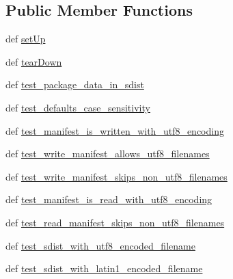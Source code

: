 \subsection*{Public Member Functions}
\begin{DoxyCompactItemize}
\item 
def \hyperlink{classsetuptools_1_1tests_1_1test__sdist_1_1TestSdistTest_ae2dbc5ce220773251c19c31be48920e6}{set\+Up}
\item 
def \hyperlink{classsetuptools_1_1tests_1_1test__sdist_1_1TestSdistTest_a79f76e00cf56e1de877a72e846bf489c}{tear\+Down}
\item 
def \hyperlink{classsetuptools_1_1tests_1_1test__sdist_1_1TestSdistTest_a3cf5c6aec4ee7a285187dd08b4dfbe5e}{test\+\_\+package\+\_\+data\+\_\+in\+\_\+sdist}
\item 
def \hyperlink{classsetuptools_1_1tests_1_1test__sdist_1_1TestSdistTest_a94e146b69c6dbac1b4d346b238a5f6f3}{test\+\_\+defaults\+\_\+case\+\_\+sensitivity}
\item 
def \hyperlink{classsetuptools_1_1tests_1_1test__sdist_1_1TestSdistTest_a2a6d02ca95bdf2d48029dbee362dc691}{test\+\_\+manifest\+\_\+is\+\_\+written\+\_\+with\+\_\+utf8\+\_\+encoding}
\item 
def \hyperlink{classsetuptools_1_1tests_1_1test__sdist_1_1TestSdistTest_a4fb3e5fbfe2f50c4477f91db4aad602b}{test\+\_\+write\+\_\+manifest\+\_\+allows\+\_\+utf8\+\_\+filenames}
\item 
def \hyperlink{classsetuptools_1_1tests_1_1test__sdist_1_1TestSdistTest_a9ef687497c2617674371d90a26db5e26}{test\+\_\+write\+\_\+manifest\+\_\+skips\+\_\+non\+\_\+utf8\+\_\+filenames}
\item 
def \hyperlink{classsetuptools_1_1tests_1_1test__sdist_1_1TestSdistTest_a098d3a86c7ce5519d3d1d1c08a772f54}{test\+\_\+manifest\+\_\+is\+\_\+read\+\_\+with\+\_\+utf8\+\_\+encoding}
\item 
def \hyperlink{classsetuptools_1_1tests_1_1test__sdist_1_1TestSdistTest_a1a74806da56105dbfa02271ee65a9120}{test\+\_\+read\+\_\+manifest\+\_\+skips\+\_\+non\+\_\+utf8\+\_\+filenames}
\item 
def \hyperlink{classsetuptools_1_1tests_1_1test__sdist_1_1TestSdistTest_ae7972943df1ce1b8a1987e3f36ebdcff}{test\+\_\+sdist\+\_\+with\+\_\+utf8\+\_\+encoded\+\_\+filename}
\item 
def \hyperlink{classsetuptools_1_1tests_1_1test__sdist_1_1TestSdistTest_ad7dd515b53d0af3e9832f6c4141297ec}{test\+\_\+sdist\+\_\+with\+\_\+latin1\+\_\+encoded\+\_\+filename}
\end{DoxyCompactItemize}
